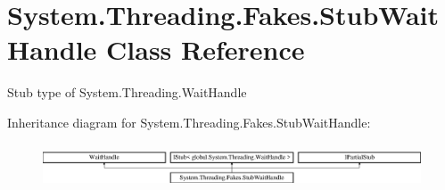 \hypertarget{class_system_1_1_threading_1_1_fakes_1_1_stub_wait_handle}{\section{System.\-Threading.\-Fakes.\-Stub\-Wait\-Handle Class Reference}
\label{class_system_1_1_threading_1_1_fakes_1_1_stub_wait_handle}
}


Stub type of System.\-Threading.\-Wait\-Handle 


Inheritance diagram for System.\-Threading.\-Fakes.\-Stub\-Wait\-Handle\-:\begin{figure}[H]
\begin{center}
\leavevmode
\includegraphics[height=1.338112cm]{class_system_1_1_threading_1_1_fakes_1_1_stub_wait_handle}
\end{center}
\end{figure}
